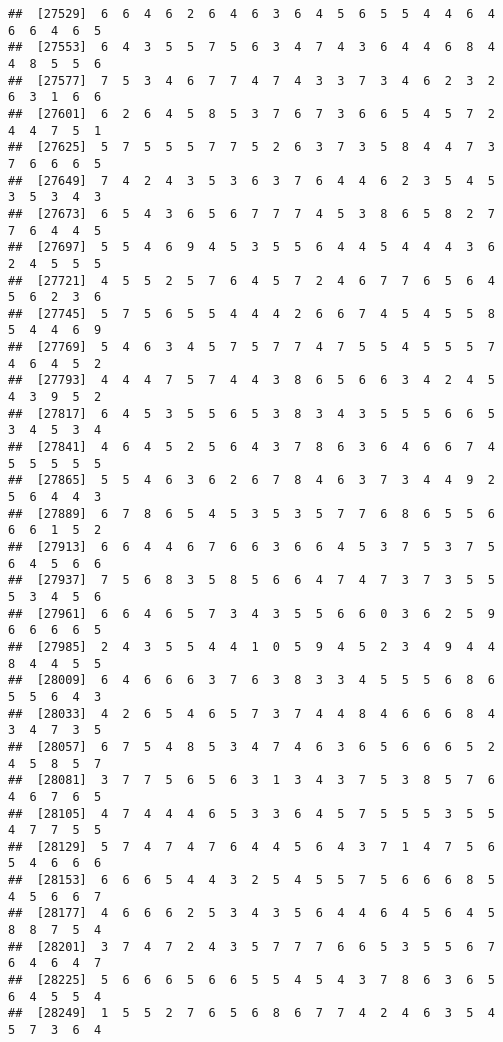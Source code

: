 \documentclass[
]{book}
\begin{document}
\begin{verbatim}
##  [27529]  6  6  4  6  2  6  4  6  3  6  4  5  6  5  5  4  4  6  4  6  6  4  6  5
##  [27553]  6  4  3  5  5  7  5  6  3  4  7  4  3  6  4  4  6  8  4  4  8  5  5  6
##  [27577]  7  5  3  4  6  7  7  4  7  4  3  3  7  3  4  6  2  3  2  6  3  1  6  6
##  [27601]  6  2  6  4  5  8  5  3  7  6  7  3  6  6  5  4  5  7  2  4  4  7  5  1
##  [27625]  5  7  5  5  5  7  7  5  2  6  3  7  3  5  8  4  4  7  3  7  6  6  6  5
##  [27649]  7  4  2  4  3  5  3  6  3  7  6  4  4  6  2  3  5  4  5  3  5  3  4  3
##  [27673]  6  5  4  3  6  5  6  7  7  7  4  5  3  8  6  5  8  2  7  7  6  4  4  5
##  [27697]  5  5  4  6  9  4  5  3  5  5  6  4  4  5  4  4  4  3  6  2  4  5  5  5
##  [27721]  4  5  5  2  5  7  6  4  5  7  2  4  6  7  7  6  5  6  4  5  6  2  3  6
##  [27745]  5  7  5  6  5  5  4  4  4  2  6  6  7  4  5  4  5  5  8  5  4  4  6  9
##  [27769]  5  4  6  3  4  5  7  5  7  7  4  7  5  5  4  5  5  5  7  4  6  4  5  2
##  [27793]  4  4  4  7  5  7  4  4  3  8  6  5  6  6  3  4  2  4  5  4  3  9  5  2
##  [27817]  6  4  5  3  5  5  6  5  3  8  3  4  3  5  5  5  6  6  5  3  4  5  3  4
##  [27841]  4  6  4  5  2  5  6  4  3  7  8  6  3  6  4  6  6  7  4  5  5  5  5  5
##  [27865]  5  5  4  6  3  6  2  6  7  8  4  6  3  7  3  4  4  9  2  5  6  4  4  3
##  [27889]  6  7  8  6  5  4  5  3  5  3  5  7  7  6  8  6  5  5  6  6  6  1  5  2
##  [27913]  6  6  4  4  6  7  6  6  3  6  6  4  5  3  7  5  3  7  5  6  4  5  6  6
##  [27937]  7  5  6  8  3  5  8  5  6  6  4  7  4  7  3  7  3  5  5  5  3  4  5  6
##  [27961]  6  6  4  6  5  7  3  4  3  5  5  6  6  0  3  6  2  5  9  6  6  6  6  5
##  [27985]  2  4  3  5  5  4  4  1  0  5  9  4  5  2  3  4  9  4  4  8  4  4  5  5
##  [28009]  6  4  6  6  6  3  7  6  3  8  3  3  4  5  5  5  6  8  6  5  5  6  4  3
##  [28033]  4  2  6  5  4  6  5  7  3  7  4  4  8  4  6  6  6  8  4  3  4  7  3  5
##  [28057]  6  7  5  4  8  5  3  4  7  4  6  3  6  5  6  6  6  5  2  4  5  8  5  7
##  [28081]  3  7  7  5  6  5  6  3  1  3  4  3  7  5  3  8  5  7  6  4  6  7  6  5
##  [28105]  4  7  4  4  4  6  5  3  3  6  4  5  7  5  5  5  3  5  5  4  7  7  5  5
##  [28129]  5  7  4  7  4  7  6  4  4  5  6  4  3  7  1  4  7  5  6  5  4  6  6  6
##  [28153]  6  6  6  5  4  4  3  2  5  4  5  5  7  5  6  6  6  8  5  4  5  6  6  7
##  [28177]  4  6  6  6  2  5  3  4  3  5  6  4  4  6  4  5  6  4  5  8  8  7  5  4
##  [28201]  3  7  4  7  2  4  3  5  7  7  7  6  6  5  3  5  5  6  7  6  4  6  4  7
##  [28225]  5  6  6  6  5  6  6  5  5  4  5  4  3  7  8  6  3  6  5  6  4  5  5  4
##  [28249]  1  5  5  2  7  6  5  6  8  6  7  7  4  2  4  6  3  5  4  5  7  3  6  4

\end{verbatim}
\end{document}
